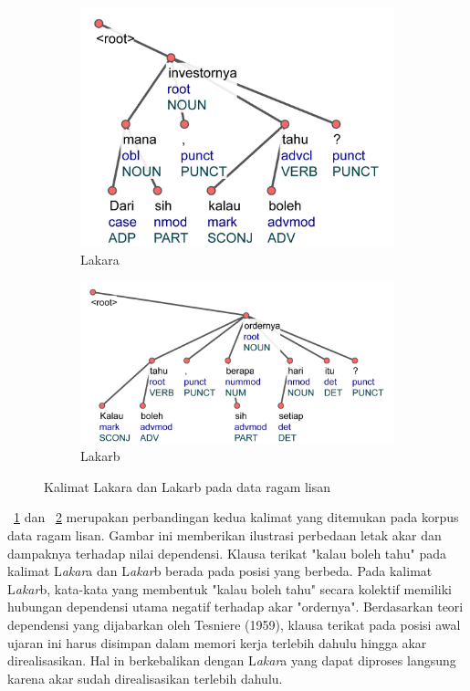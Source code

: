 \begin{figure}
\centering

\begin{subfigure}{.4\linewidth}
  \centering
  \includegraphics[width=1\linewidth] {pics/ls1436.jpg} 
	\caption{Lakara}
	\label{fig:ls1436} 
\end{subfigure}
%
\begin{subfigure}{.58\linewidth}
  \centering
  \includegraphics[width=1\linewidth]{pics/ls1460.jpg} 
	\caption{Lakarb}
	\label{fig:ls1460} 
\end{subfigure}

\caption{Kalimat Lakara dan Lakarb pada data ragam lisan}
\label{fig:akarcontoh}
\end{figure}


\pic~\ref{fig:ls1436} dan \pic~\ref{fig:ls1460} merupakan perbandingan kedua kalimat yang ditemukan pada korpus data ragam lisan. Gambar ini memberikan ilustrasi perbedaan letak akar dan dampaknya terhadap nilai dependensi. Klausa terikat "kalau boleh tahu" pada kalimat L\textit{akar}a dan L\textit{akar}b berada pada posisi yang berbeda. Pada kalimat L\textit{akar}b, kata-kata yang membentuk "kalau boleh tahu" secara kolektif memiliki hubungan dependensi utama negatif terhadap akar "ordernya". Berdasarkan teori dependensi yang dijabarkan oleh Tesniere (1959), klausa terikat pada posisi awal ujaran ini harus disimpan dalam memori kerja terlebih dahulu hingga akar direalisasikan. Hal in berkebalikan dengan L\textit{akar}a yang dapat diproses langsung karena akar sudah direalisasikan terlebih dahulu.

